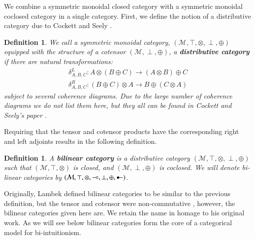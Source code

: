 \documentclass{lmcs}
\newtheorem{definition}[theorem]{Definition}
\let\mto\to
\let\to\relax
\newcommand{\to}{\rightarrow}
\newcommand{\cat}[1]{\mathcal{#1}}
\newcommand{\limp}[0]{\multimap}
\newcommand{\colimp}[0]{\multimapdotinv}
\begin{document}
We combine a symmetric monoidal closed category with a symmetric
monoidal coclosed category in a single category.  First, we define the
notion of a distributive category due to Cockett and Seely
\cite{Cockett:1997}.
\begin{definition}
  \label{def:dist-cat}
  We call a symmetric monoidal category, $(\cat{M}, \top, \otimes,
  \perp, \oplus)$ equipped with the structure of a cotensor $(\cat{M},
  \perp, \oplus)$, a \textbf{distributive category} if there are
  natural transformations:
  \[
  \begin{array}{lll}
    \delta^L_{A,B,C} : A \otimes (B \oplus C) \mto (A \otimes B) \oplus C\\
    \delta^R_{A,B,C} : (B \oplus C) \otimes A \mto B \oplus (C \otimes A)
  \end{array}
  \]
  subject to several coherence diagrams.  Due to the large number of
  coherence diagrams we do not list them here, but they all can be
  found in Cockett and Seely's paper \cite{Cockett:1997}.
\end{definition}
\noindent
Requiring that the tensor and cotensor products have the corresponding
right and left adjoints results in the following definition.
\begin{definition}
  \label{def:bilinear-cat}
  A \textbf{bilinear category} is a distributive category $(\cat{M},
  \top, \otimes, \perp, \oplus)$ such that $(\cat{M}, \top, \otimes)$
  is closed, and $(\cat{M}, \perp, \oplus)$ is coclosed.  We will
  denote bi-linear categories by $(\cat{M}, \top, \otimes, \limp, \perp,
  \oplus, \colimp)$.
\end{definition}
Originally, Lambek defined bilinear categories to be similar to the
previous definition, but the tensor and cotensor were non-commutative
\cite{Cockett:1997a}, however, the bilinear categories given here
are. We retain the name in homage to his original work.  As we will
see below bilinear categories form the core of a categorical model for
bi-intuitionism.
\end{document}
